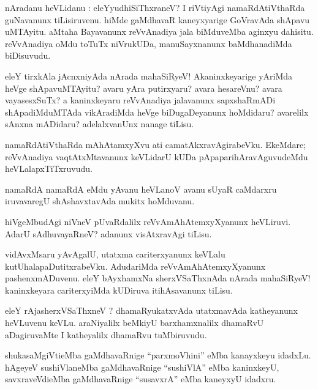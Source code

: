 \documentclass{article}
\begin{document}

\begin{mn}
nAradanu heVLidanu : eleYyudhiSiThxraneV? I riVtiyAgi namaRdAtiVthaRda guNavanunx tiLisiruvenu.
hiMde gaMdhavaR kaneyxyarige GoVravAda shApavu uMTAyitu. aMtaha Bayavanunx 
reVvAnadiya jala biMduveMba aginxyu dahisitu. reVvAnadiya oMdu toTuTx niVrukUDa, manuSayxnanunx 
baMdhanadiMda biDisuvudu.
\end{mn}

\begin{mn}
eleY tirxkAla jAcnxniyAda nArada mahaSiRyeV! Akaninxkeyarige yAriMda heVge shApavuMTAyitu?
avaru yAra putirxyaru? avara hesareVnu? avara vayasesxSuTx? a kaninxkeyaru reVvAnadiya jalavanunx 
sapxshaRmADi shApadiMduMTAda vikAradiMda heVge biDugaDeyanunx hoMdidaru? avarelilx sAnxna 
mADidaru? adelalxvanUnx nanage tiLisu.
\end{mn}

\begin{mn}
namaRdAtiVthaRda mAhAtamxyXvu ati camatAkxravAgirabeVku. EkeMdare; reVvAnadiya vaqtAtxMtavanunx
keVLidarU kUDa pApaparihAravAguvudeMdu heVLalapxTiTxruvudu.
\end{mn}

\begin{mn}
namaRdA namaRdA eMdu yAvanu heVLanoV avanu sUyaR caMdarxru iruvavaregU shAshavxtavAda mukitx 
hoMduvanu.
\end{mn}

\begin{mn}
hiVgeMbudAgi niVneV pUvaRdalilx reVvAmAhAtemxyXyanunx heVLiruvi. AdarU sAdhuvayaRneV? adanunx 
visAtxravAgi tiLisu.
\end{mn}

\begin{mn}
vidAvxMsaru yAvAgalU, utatxma cariterxyanunx keVLalu kutUhalapaDutitxrabeVku. AdudariMda 
reVvAmAhAtemxyXyanunx pashenxmADuvenu. eleY bAyxhamxNa sherxVSaThxnAda nArada mahaSiRyeV! 
kaninxkeyara cariterxyiMda kUDiruva itihAsavanunx tiLisu.
\end{mn}

\begin{mn}
eleY rAjasherxVSaThxneV ? dhamaRyukatxvAda utatxmavAda katheyanunx heVLuvenu keVLu.
araNiyalilx beMkiyU barxhamxnalilx dhamaRvU aDagiruvaMte I katheyalilx dhamaRvu tuMbiruvudu.
\end{mn}

\begin{mn}
shukasaMgiVtieMba gaMdhavaRnige ``parxmoVhini'' eMba kanayxkeyu idadxLu. hAgeyeV sushiVlaneMba 
gaMdhavaRnige ``sushiVlA'' eMba kaninxkeyU, savxraveVdieMba gaMdhavaRnige ``susavxrA'' eMba 
kaneyxyU idadxru.
\end{mn}
\end{document}
